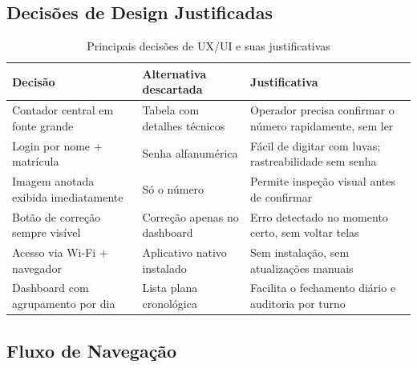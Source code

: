 \documentclass[12pt,a4paper]{article}
\begin{document}
\subsection{Decis\~oes de Design Justificadas}

\begin{table}[H]
  \centering
  \caption{Principais decis\~oes de UX/UI e suas justificativas}
  \label{tab:ux}
  \renewcommand{\arraystretch}{1.2}
  \begin{tabular}{p{4.2cm}p{4.2cm}p{4.2cm}}
    \toprule
    \textbf{Decis\~ao} & \textbf{Alternativa descartada} & \textbf{Justificativa} \\
    \midrule
    Contador central em fonte grande
      & Tabela com detalhes t\'ecnicos
      & Operador precisa confirmar o n\'umero rapidamente, sem ler \\
    Login por nome + matr\'icula
      & Senha alfanum\'erica
      & F\'acil de digitar com luvas; rastreabilidade sem senha \\
    Imagem anotada exibida imediatamente
      & S\'o o n\'umero
      & Permite inspe\c{c}\~ao visual antes de confirmar \\
    Bot\~ao de corre\c{c}\~ao sempre vis\'ivel
      & Corre\c{c}\~ao apenas no dashboard
      & Erro detectado no momento certo, sem voltar telas \\
    Acesso via Wi-Fi + navegador
      & Aplicativo nativo instalado
      & Sem instala\c{c}\~ao, sem atualiza\c{c}\~oes manuais \\
    Dashboard com agrupamento por dia
      & Lista plana cronol\'ogica
      & Facilita o fechamento di\'ario e auditoria por turno \\
    \bottomrule
  \end{tabular}
\end{table}

\subsection{Fluxo de Navega\c{c}\~ao}

\begin{center}
\end{center}
\end{document}
